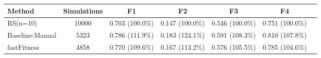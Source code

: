 \begin{tabular}{lcccccc}
\toprule
         Method &  Simulations &              F1 &              F2 &              F3 &              F4 \\
\midrule
       RS(n=10) &        10000 & 0.703 (100.0\%) & 0.147 (100.0\%) & 0.546 (100.0\%) & 0.751 (100.0\%) \\
Baseline-Manual &         5323 & 0.786 (111.9\%) & 0.183 (124.1\%) & 0.591 (108.3\%) & 0.810 (107.8\%) \\
    fastFitness &         4858 & 0.770 (109.6\%) & 0.167 (113.2\%) & 0.576 (105.5\%) & 0.785 (104.6\%) \\
\bottomrule
\end{tabular}

